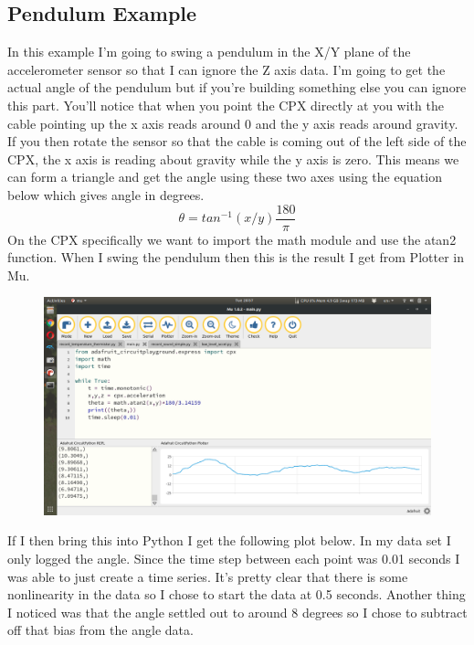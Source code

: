\subsection{Pendulum Example}

In this example I'm going to swing a pendulum in the X/Y plane of the accelerometer sensor so that I can ignore the Z axis data. I'm going to get the actual angle of the pendulum but if you're building something else you can ignore this part. You’ll notice that when you point the CPX directly at you with the cable pointing up the x axis reads around 0 and the y axis reads around gravity. If you then rotate the sensor so that the cable is coming out of the left side of the CPX, the x axis is reading about gravity while the y axis is zero. This means we can form a triangle and get the angle using these two axes using the equation below which gives angle in degrees.
\begin{equation}
\theta = tan^{-1}(x/y)\frac{180}{\pi}
\end{equation}
On the CPX specifically we want to import the math module and use the atan2 function. When I swing the pendulum then this is the result I get from Plotter in Mu.
\begin{figure}[H]
  \begin{center}
    \includegraphics[width=\textwidth]{Figures/oscillation_mu.png}
  \end{center}
\end{figure}
If I then bring this into Python I get the following plot below. In my data set I only logged the angle. Since the time step between each point was 0.01 seconds I was able to just create a time series. It’s pretty clear that there is some nonlinearity in the data so I chose to start the data at 0.5 seconds. Another thing I noticed was that the angle settled out to around 8 degrees so I chose to subtract off that bias from the angle data.
